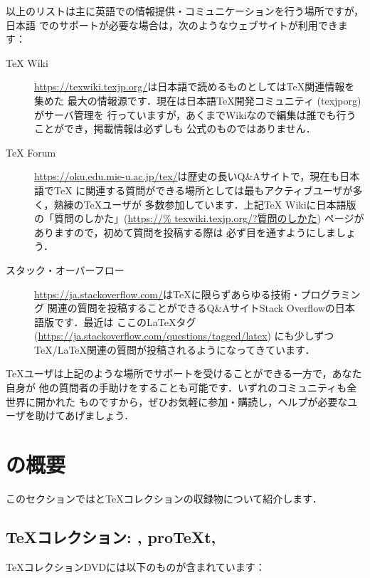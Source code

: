 \documentclass[uplatex,dvipdfmx,tombow]{jsarticle}
\begin{document}
%
以上のリストは主に英語での情報提供・コミュニケーションを行う場所ですが，日本語
でのサポートが必要な場合は，次のようなウェブサイトが利用できます：
%
\begin{description}
\item[{\TeX} Wiki]
\url{https://texwiki.texjp.org/}は日本語で読めるものとしては\TeX 関連情報を集めた
最大の情報源です．現在は日本語\TeX 開発コミュニティ (texjporg) がサーバ管理を
行っていますが，あくまでWikiなので編集は誰でも行うことができ，掲載情報は必ずしも
公式のものではありません．

\item[{\TeX} Forum]
\url{https://oku.edu.mie-u.ac.jp/tex/}は歴史の長いQ\&Aサイトで，現在も日本語で\TeX
に関連する質問ができる場所としては最もアクティブユーザが多く，熟練の\TeX ユーザが
多数参加しています．上記{\TeX} Wikiに日本語版の「質問のしかた」(\url{https://%
texwiki.texjp.org/?質問のしかた}) ページがありますので，初めて質問を投稿する際は
必ず目を通すようにしましょう．

\item[スタック・オーバーフロー]
\url{https://ja.stackoverflow.com/}は\TeX に限らずあらゆる技術・プログラミング
関連の質問を投稿することができるQ\&AサイトStack Overflowの日本語版です．最近は
ここの\LaTeX タグ (\url{https://ja.stackoverflow.com/questions/tagged/latex})
にも少しずつ\TeX/\LaTeX 関連の質問が投稿されるようになってきています．
\end{description}

\TeX ユーザは上記のような場所でサポートを受けることができる一方で，あなた自身が
他の質問者の手助けをすることも可能です．いずれのコミュニティも全世界に開かれた
ものですから，ぜひお気軽に参加・購読し，ヘルプが必要なユーザを助けてあげましょう．

\section{\TL の概要}
\label{sec:overview-tl}

このセクションでは\TL と\TeX コレクションの収録物について紹介します．

\subsection{\TeX コレクション: \TL, pro\TeX{}t, \MacTeX}
\label{sec:tl-coll-dists}

\TeX コレクションDVDには以下のものが含まれています：
\end{document}
